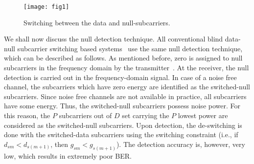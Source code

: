 \documentclass[journal,comsoc]{IEEEtran}
\begin{document}
\begin{figure}[!t]
\centering
\texttt{[image: fig1]}
\caption{Switching between the data and null-subcarriers.}
\label{fig:fig1}
\end{figure}


   We shall now discuss the null detection technique. All conventional blind data-null subcarrier switching based systems~\cite{IEEEhowto:wong1,IEEEhowto:sabbir1,IEEEhowto:sabbir2,IEEEhowto:sabbir3,IEEEhowto:wong2} use the same null detection technique, which can be described as follows. As mentioned before, zero is assigned to null subcarriers in the frequency domain by the transmitter~\cite{IEEEhowto:Li}. At the receiver, the null detection is carried out in the frequency-domain signal.  In case of a noise free channel, the subcarriers which have zero energy are identified as the switched-null subcarriers. Since noise free channels are not available in practice, all subcarriers have some energy. Thus, the switched-null subcarriers possess noise power. For this reason, the $P$ subcarriers out of $D$ set carrying the $P$ lowest power are considered as the switched-null subcarriers. Upon detection, the de-switching is done with the switched-data subcarriers using the switching constraint (i.e., if $d_{sm}<d_{s(m+1)}$, then $g_{sm}<g_{s(m+1)}$). The detection accuracy is, however, very low, which results in extremely poor BER.
   
\end{document}
